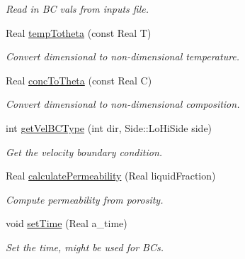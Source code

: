 \begin{DoxyCompactItemize}
\begin{DoxyCompactList}\small\item\em Read in B\-C vals from inputs file. \end{DoxyCompactList}\item 
\hypertarget{class_mushy_layer_params_a096f90c939815ffda795d7c81a0a25d3}{Real \hyperlink{class_mushy_layer_params_a096f90c939815ffda795d7c81a0a25d3}{temp\-Totheta} (const Real T)}\label{class_mushy_layer_params_a096f90c939815ffda795d7c81a0a25d3}

\begin{DoxyCompactList}\small\item\em Convert dimensional to non-\/dimensional temperature. \end{DoxyCompactList}\item 
\hypertarget{class_mushy_layer_params_ab9cc390b6c5db5c4d6f083c0f2f14503}{Real \hyperlink{class_mushy_layer_params_ab9cc390b6c5db5c4d6f083c0f2f14503}{conc\-To\-Theta} (const Real C)}\label{class_mushy_layer_params_ab9cc390b6c5db5c4d6f083c0f2f14503}

\begin{DoxyCompactList}\small\item\em Convert dimensional to non-\/dimensional composition. \end{DoxyCompactList}\item 
\hypertarget{class_mushy_layer_params_ae036d6b6250a955546827dd17b9f967c}{int \hyperlink{class_mushy_layer_params_ae036d6b6250a955546827dd17b9f967c}{get\-Vel\-B\-C\-Type} (int dir, Side\-::\-Lo\-Hi\-Side side)}\label{class_mushy_layer_params_ae036d6b6250a955546827dd17b9f967c}

\begin{DoxyCompactList}\small\item\em Get the velocity boundary condition. \end{DoxyCompactList}\item 
\hypertarget{class_mushy_layer_params_a4b241acadb703afb0034a7bc39bdce00}{Real \hyperlink{class_mushy_layer_params_a4b241acadb703afb0034a7bc39bdce00}{calculate\-Permeability} (Real liquid\-Fraction)}\label{class_mushy_layer_params_a4b241acadb703afb0034a7bc39bdce00}

\begin{DoxyCompactList}\small\item\em Compute permeability from porosity. \end{DoxyCompactList}\item 
\hypertarget{class_mushy_layer_params_ab026a06d59c128d23f360e83cbd41eaa}{void \hyperlink{class_mushy_layer_params_ab026a06d59c128d23f360e83cbd41eaa}{set\-Time} (Real a\-\_\-time)}\label{class_mushy_layer_params_ab026a06d59c128d23f360e83cbd41eaa}

\begin{DoxyCompactList}\small\item\em Set the time, might be used for B\-Cs. \end{DoxyCompactList}\end{DoxyCompactItemize}
